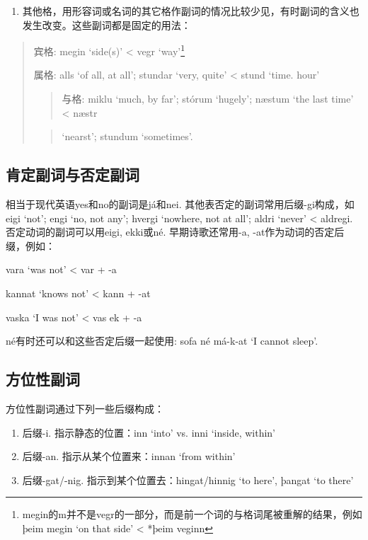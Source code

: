 \begin{enumerate}
  \def\labelenumi{\arabic{enumi})}
  \setcounter{enumi}{2}
  \item
        其他格，用形容词或名词的其它格作副词的情况比较少见，有时副词的含义也发生改变。这些副词都是固定的用法：
\end{enumerate}

\begin{quote}
  宾格: megin `side(s)‌' \textless{} vegr `way‌'\footnote{megin的m并不是vegr的一部分，而是前一个词的与格词尾被重解的结果，例如þeim
    megin `on that side' \textless{} *þeim veginn}

  属格: alls `of all, at all‌'; stundar `very, quite‌' \textless{} stund
  `time. hour'

  \begin{quote}
    与格: miklu `much, by far‌'; stórum `hugely‌'; næstum `the last time‌'
    \textless{} næstr
  \end{quote}

  \begin{quote}
    `nearst'; stundum `sometimes‌'.
  \end{quote}
\end{quote}

\subsection{肯定副词与否定副词}\label{肯定副词与否定副词}

相当于现代英语yes和no的副词是já和nei.
其他表否定的副词常用后缀-gi构成，如eigi `not‌'; engi `no, not any‌';
hvergi `nowhere, not at all‌'; aldri `never‌' \textless{} aldregi.
否定动词的副词可以用eigi, ekki或né. 早期诗歌还常用-a,
-at作为动词的否定后缀，例如：

vara `was not' \textless{} var + -a

kannat `knows not' \textless{} kann + -at

vaska `I was not‌' \textless{} vas ek + -a

né有时还可以和这些否定后缀一起使用: sofa né má-k-at `I cannot sleep‌'.

\subsection{方位性副词}\label{方位性副词}

方位性副词通过下列一些后缀构成：

\begin{enumerate}
  \def\labelenumi{\arabic{enumi})}
  \item
        后缀-i. 指示静态的位置：inn `into‌' vs. inni `inside, within‌'
  \item
        后缀-an. 指示从某个位置来：innan `from within‌'
  \item
        后缀-gat/-nig. 指示到某个位置去：hingat/hinnig `to here‌', þangat `to
        there‌'
\end{enumerate}

